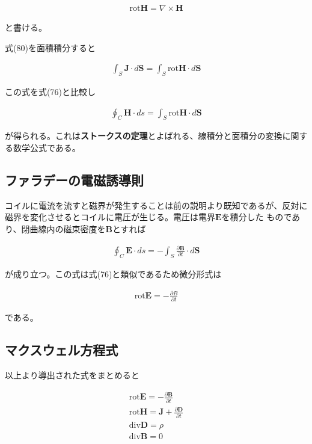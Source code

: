 \documentclass[7pt,uplatex,dvipdfmx,twocolumn]{jsarticle}
\begin{document}
\begin{align}
\mathrm{rot}\bm{H}=\nabla\times \bm{H}
\end{align}

と書ける。

式(80)を面積積分すると

\begin{align}
\int_S \bm{J}\cdot d\bm{S}=\int_S \mathrm{rot}\bm{H}\cdot d\bm{S}
\end{align}

この式を式(76)と比較し

\begin{align}
\oint_C\bm{H}\cdot ds=\int_S \mathrm{rot}\bm{H}\cdot d\bm{S}
\end{align}

が得られる。これは\textbf{ストークスの定理}とよばれる、線積分と面積分の変換に関する数学公式である。

\subsection{ファラデーの電磁誘導則}

コイルに電流を流すと磁界が発生することは前の説明より既知であるが、反対に磁界を変化させるとコイルに電圧が生じる。電圧は電界$\bm{E}$を積分した
ものであり、閉曲線内の磁束密度を$\bm{B}$とすれば

\begin{align}
\oint_C\bm{E}\cdot ds=-\int_S\frac{\partial\bm{B}}{\partial t}\cdot d\bm{S}
\end{align}

が成り立つ。この式は式(76)と類似であるため微分形式は

\begin{align}
\mathrm{rot}\bm{E}=-\frac{\partial B}{\partial t}
\end{align}

である。

\subsection{マクスウェル方程式}

以上より導出された式をまとめると

\begin{align}
\mathrm{rot}\bm{E}=-\frac{\partial \bm{B}}{\partial t} \\
\mathrm{rot}\bm{H}=\bm{J}+\frac{\partial \bm{D}}{\partial t} \\
\mathrm{div}\bm{D}=\rho \\
\mathrm{div}\bm{B}=0
\end{align}
\end{document}
